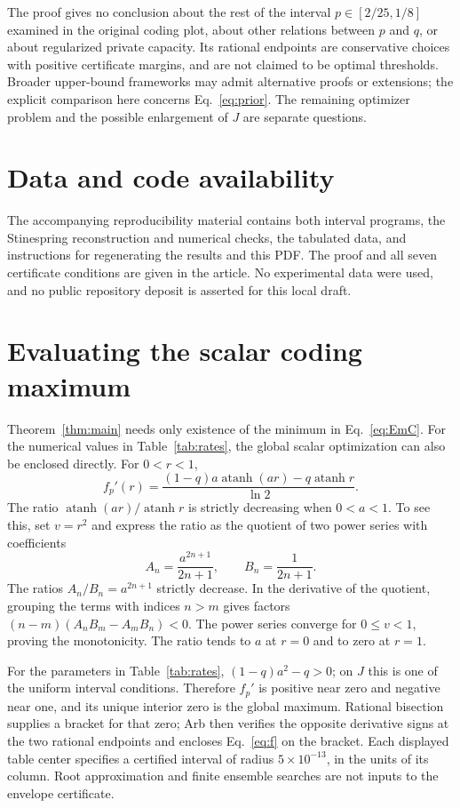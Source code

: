 \documentclass[aps,pra,reprint,amsmath,amssymb,longbibliography,nofootinbib]{revtex4-2}
\newcommand{\atanh}{\operatorname{atanh}}
\begin{document}
The proof gives no conclusion about the rest of the interval $p\in[2/25,1/8]$ examined in the original coding plot, about other relations between $p$ and $q$, or about regularized private capacity. Its rational endpoints are conservative choices with positive certificate margins, and are not claimed to be optimal thresholds. Broader upper-bound frameworks may admit alternative proofs or extensions; the explicit comparison here concerns Eq.~\eqref{eq:prior}. The remaining optimizer problem and the possible enlargement of $J$ are separate questions.

\section*{Data and code availability}
The accompanying reproducibility material contains both interval programs, the Stinespring reconstruction and numerical checks, the tabulated data, and instructions for regenerating the results and this PDF. The proof and all seven certificate conditions are given in the article. No experimental data were used, and no public repository deposit is asserted for this local draft.

\appendix
\section{Evaluating the scalar coding maximum}\label{app:root}
Theorem~\ref{thm:main} needs only existence of the minimum in Eq.~\eqref{eq:EmC}. For the numerical values in Table~\ref{tab:rates}, the global scalar optimization can also be enclosed directly. For $0<r<1$,
\begin{equation}
 f_p'(r)=\frac{(1-q)a\atanh(ar)-q\atanh r}{\ln2}.
 \label{eq:fprime}
\end{equation}
The ratio $\atanh(ar)/\atanh r$ is strictly decreasing when $0<a<1$. To see this, set $v=r^2$ and express the ratio as the quotient of two power series with coefficients
\begin{equation}
 A_n=\frac{a^{2n+1}}{2n+1},\qquad B_n=\frac1{2n+1}.
\end{equation}
The ratios $A_n/B_n=a^{2n+1}$ strictly decrease. In the derivative of the quotient, grouping the terms with indices $n>m$ gives factors
$(n-m)(A_nB_m-A_mB_n)<0$. The power series converge for $0\le v<1$, proving the monotonicity. The ratio tends to $a$ at $r=0$ and to zero at $r=1$.

For the parameters in Table~\ref{tab:rates}, $(1-q)a^2-q>0$; on $J$ this is one of the uniform interval conditions. Therefore $f_p'$ is positive near zero and negative near one, and its unique interior zero is the global maximum. Rational bisection supplies a bracket for that zero; Arb then verifies the opposite derivative signs at the two rational endpoints and encloses Eq.~\eqref{eq:f} on the bracket. Each displayed table center specifies a certified interval of radius $5\times10^{-13}$, in the units of its column. Root approximation and finite ensemble searches are not inputs to the envelope certificate.


\end{document}

